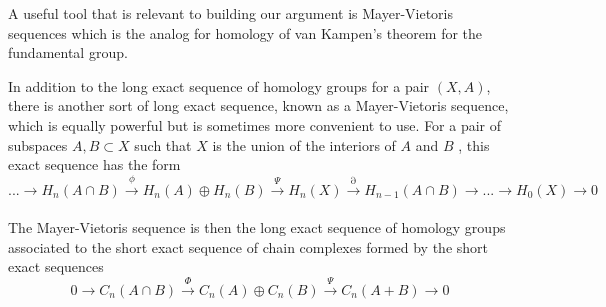 \documentclass[11pt,a4paper]{report}
\begin{document}
\begin{center}
            \end{center}
            \par
            A useful tool that is relevant to building our argument is 
            Mayer-Vietoris sequences which is the analog for homology of van Kampen's theorem for the
            fundamental group.
            
             In addition to the long exact sequence of homology groups for a pair $(X, A)$, there is another sort of long exact sequence, known as a Mayer-Vietoris sequence, which is equally powerful but is sometimes more convenient to use. For a pair of subspaces $A, B \subset X$ such that $X$ is the union of the interiors of $A$ and $B$ , this exact sequence has the form
     \[ ... \rightarrow H_n(A \cap B) \xrightarrow{\phi} H_n(A) \oplus H_n(B) \xrightarrow{\Psi} H_n(X) \xrightarrow{\partial} H_{n-1}(A \cap B) \rightarrow ... \rightarrow H_0(X) \rightarrow 0 \]
     \\
      The Mayer-Vietoris sequence is then the long exact sequence of homology groups associated to the short exact sequence of chain complexes formed by the short exact sequences
      \[ 0 \rightarrow C_n(A \cap B) \xrightarrow{\Phi} C_n(A) \oplus C_n(B) \xrightarrow{\Psi} C_n(A + B) \rightarrow 0 \]
\end{document}
